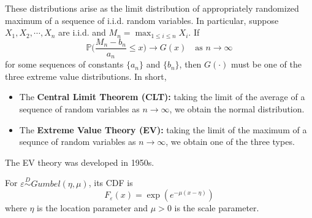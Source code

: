 \documentclass[11pt]{article}
\newcommand{\p}{\mathbb{P}}
\begin{document}
\begin{tcolorbox}
These distributions arise as the limit distribution of appropriately randomized maximum of a sequence of i.i.d. random variables. In particular, suppose $X_1,X_2,\cdots,X_n$ are i.i.d. and $M_n=\displaystyle\max_{1\leq i\leq n}X_i$. If 
$$\p\bigg(\frac{M_n-b_n}{a_n}\leq x\bigg)\to G(x)\quad\mbox{as }n\to\infty$$
for some sequences of constants $\{a_n\}$ and $\{b_n\}$, then $G(\cdot)$ must be one of the three extreme value distributions. In short,
\begin{itemize}
\item The \textbf{Central Limit Theorem (CLT):} taking the limit of the average of a sequence of random variables as $n\to\infty$, we obtain the normal distribution.
\item The \textbf{Extreme Value Theory (EV):} taking the limit of the maximum of a sequnce of random variables as $n\to\infty$, we obtain one of the three types.
\end{itemize}
The EV theory was developed in 1950s.
\end{tcolorbox}
\noindent For $\varepsilon\overset{D}\sim Gumbel(\eta,\mu)$, its CDF is $$F_\varepsilon(x)=\exp(e^{-\mu(x-\eta)})$$ where $\eta$ is the location parameter and $\mu>0$ is the scale parameter.
\end{document}
